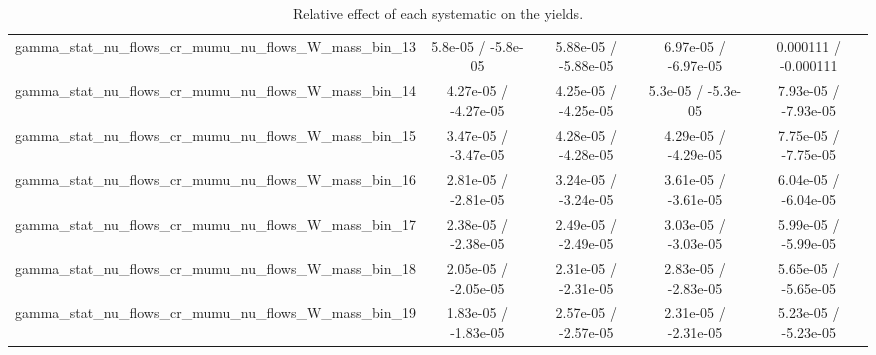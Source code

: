 \documentclass[10pt]{article}
\begin{document}
\begin{table}[htbp]
\begin{center}
\begin{tabular}{|c|c|c|c|c|}
  gamma_stat_nu_flows_cr_mumu_nu_flows_W_mass_bin_13 & 5.8e-05 / -5.8e-05 & 5.88e-05 / -5.88e-05 & 6.97e-05 / -6.97e-05 & 0.000111 / -0.000111 \\ 
  gamma_stat_nu_flows_cr_mumu_nu_flows_W_mass_bin_14 & 4.27e-05 / -4.27e-05 & 4.25e-05 / -4.25e-05 & 5.3e-05 / -5.3e-05 & 7.93e-05 / -7.93e-05 \\ 
  gamma_stat_nu_flows_cr_mumu_nu_flows_W_mass_bin_15 & 3.47e-05 / -3.47e-05 & 4.28e-05 / -4.28e-05 & 4.29e-05 / -4.29e-05 & 7.75e-05 / -7.75e-05 \\ 
  gamma_stat_nu_flows_cr_mumu_nu_flows_W_mass_bin_16 & 2.81e-05 / -2.81e-05 & 3.24e-05 / -3.24e-05 & 3.61e-05 / -3.61e-05 & 6.04e-05 / -6.04e-05 \\ 
  gamma_stat_nu_flows_cr_mumu_nu_flows_W_mass_bin_17 & 2.38e-05 / -2.38e-05 & 2.49e-05 / -2.49e-05 & 3.03e-05 / -3.03e-05 & 5.99e-05 / -5.99e-05 \\ 
  gamma_stat_nu_flows_cr_mumu_nu_flows_W_mass_bin_18 & 2.05e-05 / -2.05e-05 & 2.31e-05 / -2.31e-05 & 2.83e-05 / -2.83e-05 & 5.65e-05 / -5.65e-05 \\ 
  gamma_stat_nu_flows_cr_mumu_nu_flows_W_mass_bin_19 & 1.83e-05 / -1.83e-05 & 2.57e-05 / -2.57e-05 & 2.31e-05 / -2.31e-05 & 5.23e-05 / -5.23e-05 \\ 
\hline 
\end{tabular} 
\caption{Relative effect of each systematic on the yields.} 
\end{center} 
\end{table} 
\end{document}
